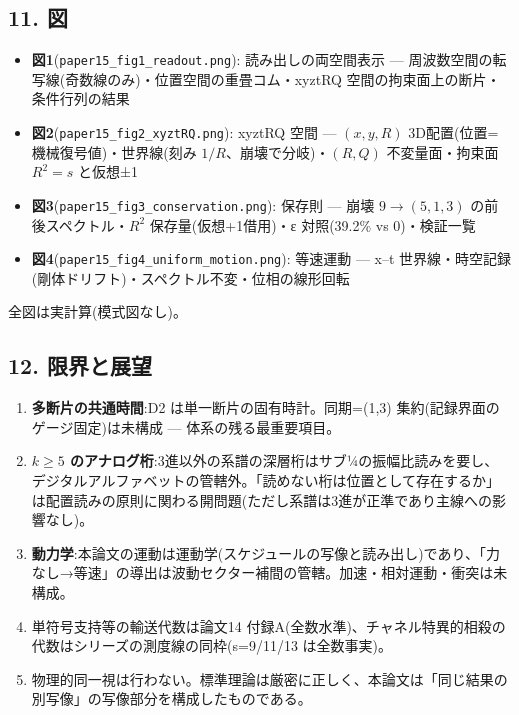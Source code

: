 \documentclass[
]{ltjsarticle}
\providecommand{\tightlist}{%
  \setlength{\itemsep}{0pt}\setlength{\parskip}{0pt}}
\begin{document}
\subsection{11. 図}\label{ux56f3}

\begin{itemize}
\tightlist
\item
  \textbf{図1}(\texttt{paper15\_fig1\_readout.png}):
  読み出しの両空間表示 ---
  周波数空間の転写線(奇数線のみ)・位置空間の重畳コム・xyztRQ
  空間の拘束面上の断片・条件行列の結果
\item
  \textbf{図2}(\texttt{paper15\_fig2\_xyztRQ.png}): xyztRQ 空間 ---
  \((x,y,R)\) 3D配置(位置=機械復号値)・世界線(刻み
  \(1/R\)、崩壊で分岐)・\((R,Q)\) 不変量面・拘束面 \(R^2=s\) と仮想±1
\item
  \textbf{図3}(\texttt{paper15\_fig3\_conservation.png}): 保存則 ---
  崩壊 \(9\to(5,1,3)\) の前後スペクトル・\(R^2\) 保存量(仮想+1借用)・ε
  対照(39.2\% vs 0)・検証一覧
\item
  \textbf{図4}(\texttt{paper15\_fig4\_uniform\_motion.png}): 等速運動
  --- x--t
  世界線・時空記録(剛体ドリフト)・スペクトル不変・位相の線形回転
\end{itemize}

全図は実計算(模式図なし)。

\subsection{12. 限界と展望}\label{ux9650ux754cux3068ux5c55ux671b}

\begin{enumerate}
\def\labelenumi{\arabic{enumi}.}
\tightlist
\item
  \textbf{多断片の共通時間}:D2 は単一断片の固有時計。同期=(1,3)
  集約(記録界面のゲージ固定)は未構成 --- 体系の残る最重要項目。
\item
  \textbf{\(k\ge5\)
  のアナログ桁}:3進以外の系譜の深層桁はサブ¼の振幅比読みを要し、デジタルアルファベットの管轄外。「読めない桁は位置として存在するか」は配置読みの原則に関わる開問題(ただし系譜は3進が正準であり主線への影響なし)。
\item
  \textbf{動力学}:本論文の運動は運動学(スケジュールの写像と読み出し)であり、「力なし→等速」の導出は波動セクター補間の管轄。加速・相対運動・衝突は未構成。
\item
  単符号支持等の輸送代数は論文14
  付録A(全数水準)、チャネル特異的相殺の代数はシリーズの測度線の同枠(s=9/11/13
  は全数事実)。
\item
  物理的同一視は行わない。標準理論は厳密に正しく、本論文は「同じ結果の別写像」の写像部分を構成したものである。
\end{enumerate}
\end{document}
